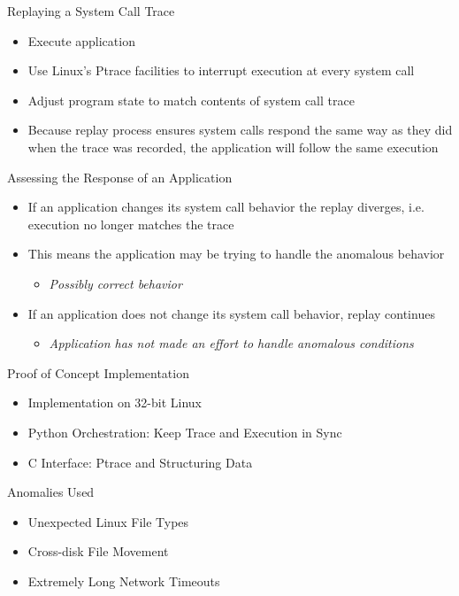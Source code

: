 \documentclass[pdf]{beamer}
\begin{document}
\begin{frame}{Replaying a System Call Trace}
  \begin{itemize}
  \item{Execute application}
  \item{Use Linux's Ptrace facilities to interrupt execution at every system
      call}
  \item{Adjust program state to match contents of system call trace}
  \item{Because replay process ensures system calls respond the same way as they
      did when the trace was recorded, the application will follow the same
      execution}
  \end{itemize}
\end{frame}


\begin{frame}{Assessing the Response of an Application}
  \begin{itemize}
  \item{If an application changes its system call behavior the replay diverges,
      i.e. execution no longer matches the trace}
  \item{This means the application may be trying to handle the anomalous behavior}
    \begin{itemize}
    \item{\textit{Possibly correct behavior}}
    \end{itemize}
  \item{If an application does not change its system call behavior, replay
      continues}
    \begin{itemize}
    \item{\textit{Application has not made an effort to handle anomalous conditions}}
    \end{itemize}
  \end{itemize}
\end{frame}


\begin{frame}{Proof of Concept Implementation}
  \begin{itemize}
  \item{Implementation on 32-bit Linux}
  \item{Python Orchestration: Keep Trace and Execution in Sync}
  \item{C Interface: Ptrace and Structuring Data}
  \end{itemize}
\end{frame}


\begin{frame}{Anomalies Used}
  \begin{itemize}
  \item{Unexpected Linux File Types}
  \item{Cross-disk File Movement}
  \item{Extremely Long Network Timeouts}
  \end{itemize}
\end{frame}
\end{document}
